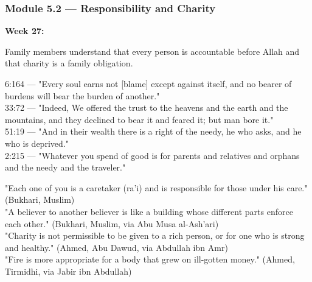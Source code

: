\documentclass[11pt,a4paper]{article}
\begin{document}
\vspace{6pt}\noindent{\color{border}\rule{\textwidth}{0.5pt}}\vspace{6pt}

\subsubsection*{Module 5.2 --- Responsibility and Charity}
\textbf{Week 27:} 

\begin{outcomebox} Family members understand that every person is accountable before Allah and that charity is a family obligation. \end{outcomebox}

\begin{quranbox} 6:164 --- "Every soul earns not [blame] except against itself, and no bearer of burdens will bear the burden of another." \\ 33:72 --- "Indeed, We offered the trust to the heavens and the earth and the mountains, and they declined to bear it and feared it; but man bore it." \\ 51:19 --- "And in their wealth there is a right of the needy, he who asks, and he who is deprived." \\ 2:215 --- "Whatever you spend of good is for parents and relatives and orphans and the needy and the traveler." \end{quranbox}

\begin{hadithbox} "Each one of you is a caretaker (ra'i) and is responsible for those under his care." (Bukhari, Muslim) \\ "A believer to another believer is like a building whose different parts enforce each other." (Bukhari, Muslim, via Abu Musa al-Ash'ari) \\ "Charity is not permissible to be given to a rich person, or for one who is strong and healthy." (Ahmed, Abu Dawud, via Abdullah ibn Amr) \\ "Fire is more appropriate for a body that grew on ill-gotten money." (Ahmed, Tirmidhi, via Jabir ibn Abdullah) \end{hadithbox}
\end{document}
